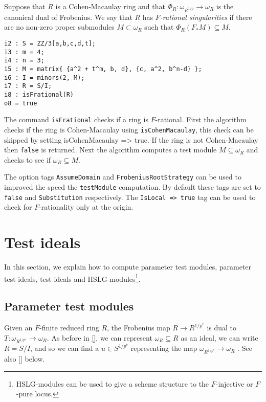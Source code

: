 \documentclass[11pt]{amsart}
\begin{document}
\begin{definition}
Suppose that $R$ is a Cohen-Macaulay ring and that $\Phi_{R} :
\omega_{R^{1/p}} \rightarrow \omega_{R}$ is the canonical dual of
Frobenius. We say that $R$ has \emph{$F$-rational singularities} if there
are no non-zero proper submodules $M \subset \omega_{R}$ such that
$\Phi_{R}(F_{*}M) \subseteq M$.
\end{definition}


\begin{verbatim}
i2 : S = ZZ/3[a,b,c,d,t];
i3 : m = 4;
i4 : n = 3;
i5 : M = matrix{ {a^2 + t^m, b, d}, {c, a^2, b^n-d} };
i6 : I = minors(2, M);
i7 : R = S/I;
i8 : isFrational(R)
o8 = true
\end{verbatim}


The command {\tt isFrational} checks if a ring is $F$-rational. First the
algorithm checks if the ring is Cohen-Macaulay using {\tt isCohenMacaulay},
this check can be skipped by setting {isCohenMacaulay => true}. If the ring
is not Cohen-Macaulay then {\tt false} is returned. Next the algorithm
computes a test module $M \subseteq \omega_{R}$ and checks to see if
$\omega_{R} \subseteq M$.


The option tags {\tt AssumeDomain} and {\tt FrobeniusRootStrategy} can be
used to improved the speed the {\tt testModule} computation. By default
these tags are set to {\tt false} and {\tt Substitution} respectively. The
{\tt IsLocal => true} tag can be used to check for $F$-rationality only at
the origin.


\section{Test ideals}\label{Section: Test Ideals}

In this section, we explain how to compute parameter test modules, parameter test ideals, test ideals and HSLG-modules\footnote{HSLG-modules can be used to give a scheme structure to the $F$-injective or $F$-pure locus.}.

\subsection{Parameter test modules}

Given an $F$-finite reduced ring $R$, the Frobenius map $R \to R^{1/p^e}$ is dual to $T : \omega_{R^{1/p^e}} \to \omega_R$.  As before in \autoref{}, we can represent $\omega_R \subseteq R$ as an ideal, we can write $R = S/I$, and so we can find a $u \in S^{1/p^e}$ representing the map $\omega_{R^{1/p^e}} \to \omega_R$ \cite{}.  See also \autoref{} below.
\end{document}
